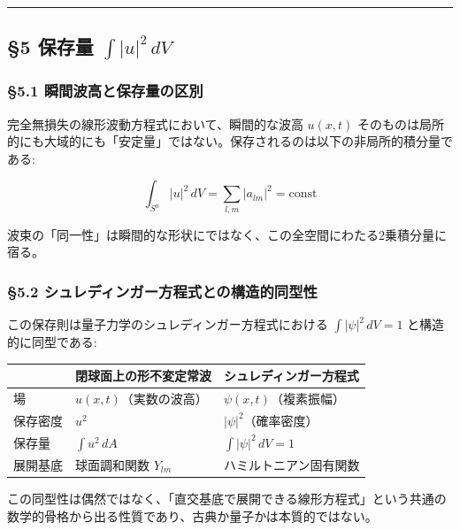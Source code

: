 \documentclass[
  a4paper,11pt]{ltjsarticle}
\newcounter{none}
\theoremstyle{definition}
\theoremstyle{remark}
\begin{document}
\begin{center}\rule{0.5\linewidth}{0.5pt}\end{center}

\subsection{\texorpdfstring{§5 保存量
\(\int |u|^2 \, dV\)}{§5 保存量 \textbackslash int \textbar u\textbar\^{}2 \textbackslash, dV}}\label{ux4fddux5b58ux91cf-int-u2-dv}

\subsubsection{§5.1
瞬間波高と保存量の区別}\label{ux77acux9593ux6ce2ux9ad8ux3068ux4fddux5b58ux91cfux306eux533aux5225}

完全無損失の線形波動方程式において、瞬間的な波高 \(u(x,t)\)
そのものは局所的にも大域的にも「安定量」ではない。保存されるのは以下の非局所的積分量である:

\[\int_{S^n} |u|^2 \, dV = \sum_{l,m} |a_{lm}|^2 = \text{const}\]

波束の「同一性」は瞬間的な形状にではなく、この全空間にわたる2乗積分量に宿る。

\subsubsection{§5.2
シュレディンガー方程式との構造的同型性}\label{ux30b7ux30e5ux30ecux30c7ux30a3ux30f3ux30acux30fcux65b9ux7a0bux5f0fux3068ux306eux69cbux9020ux7684ux540cux578bux6027}

この保存則は量子力学のシュレディンガー方程式における
\(\int |\psi|^2 \, dV = 1\) と構造的に同型である:

{\def\LTcaptype{none} %
\begin{longtable}[]{@{}lll@{}}
\toprule\noalign{}
& 閉球面上の形不変定常波 & シュレディンガー方程式 \\
\midrule\noalign{}
\endhead
\bottomrule\noalign{}
\endlastfoot
場 & \(u(x,t)\)（実数の波高） & \(\psi(x,t)\)（複素振幅） \\
保存密度 & \(u^2\) & \(|\psi|^2\)（確率密度） \\
保存量 & \(\int u^2 \, dA\) & \(\int |\psi|^2 \, dV = 1\) \\
展開基底 & 球面調和関数 \(Y_{lm}\) & ハミルトニアン固有関数 \\
\end{longtable}
}

この同型性は偶然ではなく、「直交基底で展開できる線形方程式」という共通の数学的骨格から出る性質であり、古典か量子かは本質的ではない。
\end{document}
